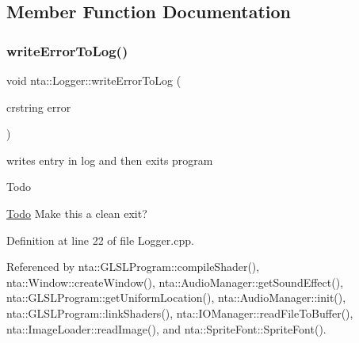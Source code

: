 \subsection{Member Function Documentation}
\mbox{\label{classnta_1_1Logger_a08299f1414203eba74b306ce6712192e}} 
\subsubsection{\texorpdfstring{write\+Error\+To\+Log()}{writeErrorToLog()}}
{\footnotesize\ttfamily void nta\+::\+Logger\+::write\+Error\+To\+Log (\begin{DoxyParamCaption}\item[{crstring}]{error }\end{DoxyParamCaption})\hspace{0.3cm}{\ttfamily [static]}}



writes entry in log and then exits program 

\begin{DoxyRefDesc}{Todo}
\item[\hyperlink{todo__todo000007}{Todo}]Make this a clean exit? \end{DoxyRefDesc}


Definition at line 22 of file Logger.\+cpp.



Referenced by nta\+::\+G\+L\+S\+L\+Program\+::compile\+Shader(), nta\+::\+Window\+::create\+Window(), nta\+::\+Audio\+Manager\+::get\+Sound\+Effect(), nta\+::\+G\+L\+S\+L\+Program\+::get\+Uniform\+Location(), nta\+::\+Audio\+Manager\+::init(), nta\+::\+G\+L\+S\+L\+Program\+::link\+Shaders(), nta\+::\+I\+O\+Manager\+::read\+File\+To\+Buffer(), nta\+::\+Image\+Loader\+::read\+Image(), and nta\+::\+Sprite\+Font\+::\+Sprite\+Font().

